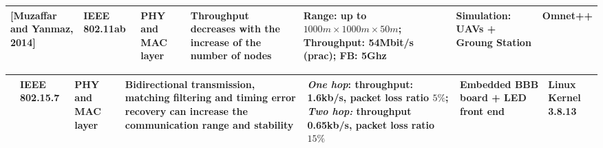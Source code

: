 \documentclass[11pt,openany]{book}
\begin{document}
\begin{algorimth}[H]
\begin{landscape}
\begin{table}[H]
\begin{tabular}{|p{1.5cm}|p{1.7cm}|p{1.3cm}|p{2.9cm}|p{2.7cm}|p{2.3cm}|p{2cm}|}
            [Muzaffar and Yanmaz, 2014]   & IEEE 802.11ab                                                         & PHY and MAC layer & Throughput decreases with the increase of the number of nodes                                                                                                                                                                                                       & Range: up to $1000m \times 1000m \times 50m$; Throughput: 54Mbit/s (prac); FB: 5Ghz                                                                                        & Simulation: UAVs + Groung Station                             & Omnet++                                                                              \\\hline
        \end{tabular}
    \end{table}
\end{landscape}
\begin{landscape}
    \begin{table}[H]
        \centering
        \begin{tabular}{|p{1.5cm}|p{1.7cm}|p{1.3cm}|p{2.9cm}|p{2.7cm}|p{2.3cm}|p{2cm}|}\hline
            [Wang et al., 2014] & IEEE 802.15.7 & PHY and MAC layer & Bidirectional transmission, matching ﬁltering and timing error recovery can increase the communication range and stability & \textit{One hop}: throughput: 1.6kb/s, packet loss ratio $5\%$; \textit{Two hop:} throughput 0.65kb/s, packet loss ratio $15\%$ & Embedded BBB board + LED front end & Linux Kernel 3.8.13 \\\hline
        \end{tabular}
    \end{table}
\end{landscape}

\end{algorimth}
\end{document}
